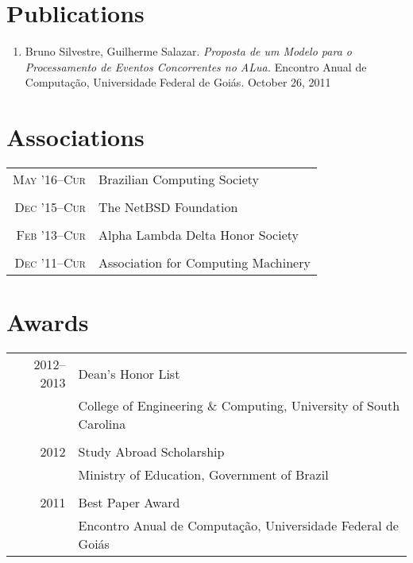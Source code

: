 \documentclass[a4paper,10pt]{article}
\begin{document}
\section{Publications}
\begin{enumerate}
  \renewcommand{\labelenumi}{[\arabic{enumi}] }
  \item Bruno Silvestre, Guilherme Salazar. \emph{Proposta de um Modelo para o
        Processamento de Eventos Concorrentes no ALua.} Encontro Anual de
        Computação, Universidade Federal de Goiás. October 26, 2011
\end{enumerate}

\section{Associations}

\begin{tabular}{r|p{11cm}}

  \textsc{May '16--Cur}
  & Brazilian Computing Society\\
  \multicolumn{2}{c}{}\\

  \textsc{Dec '15--Cur}
  & The NetBSD Foundation
  \\\multicolumn{2}{c}{}\\

  \textsc{Feb '13--Cur}
  & Alpha Lambda Delta Honor Society\\
  \multicolumn{2}{c}{}\\

  \textsc{Dec '11--Cur}
  & Association for Computing Machinery\\

\end{tabular}

\section{Awards}
\begin{tabular}{r|p{11cm}}

  \textsc{2012--2013}
  & Dean's Honor List\\
  & College of Engineering \& Computing, University of South Carolina\\
  \multicolumn{2}{c}{}\\

  \textsc{2012}
  & Study Abroad Scholarship\\
  & Ministry of Education, Government of Brazil\\
  \multicolumn{2}{c}{}\\

  \textsc{2011}
  & Best Paper Award\\
  & Encontro Anual de Computação, Universidade Federal de Goiás\\

\end{tabular}
\end{document}
